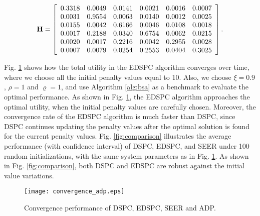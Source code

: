\documentclass[10pt,journal,letterpaper,compsoc]{IEEEtran}
\begin{document}
{{\vspace{-0.25cm}
\begin{small}
\[
\mathbf{H }= \left[ {\begin{array}{*{20}c}
   {{\rm{0}}{\rm{.3318}}} & {{\rm{0}}{\rm{.0049}}} & {{\rm{0}}{\rm{.0141}}} & {{\rm{0}}{\rm{.0021}}} & {{\rm{0}}{\rm{.0016}}} & {{\rm{0}}{\rm{.0007}}}  \\
   {{\rm{0}}{\rm{.0031}}} & {{\rm{0}}{\rm{.9554}}} & {{\rm{0}}{\rm{.0063}}} & {{\rm{0}}{\rm{.0140}}} & {{\rm{0}}{\rm{.0012}}} & {{\rm{0}}{\rm{.0025}}}  \\
   {{\rm{0}}{\rm{.0155}}} & {{\rm{0}}{\rm{.0042}}} & {{\rm{0}}{\rm{.6166}}} & {{\rm{0}}{\rm{.0046}}} & {{\rm{0}}{\rm{.0108}}} & {{\rm{0}}{\rm{.0018}}}  \\
   {{\rm{0}}{\rm{.0017}}} & {{\rm{0}}{\rm{.2188}}} & {{\rm{0}}{\rm{.0340}}} & {{\rm{0}}{\rm{.6754}}} & {{\rm{0}}{\rm{.0062}}} & {{\rm{0}}{\rm{.0215}}}  \\
   {{\rm{0}}{\rm{.0020}}} & {{\rm{0}}{\rm{.0017}}} & {{\rm{0}}{\rm{.2216}}} & {{\rm{0}}{\rm{.0042}}} & {{\rm{0}}{\rm{.2955}}} & {{\rm{0}}{\rm{.0028}}}  \\
   {{\rm{0}}{\rm{.0007}}} & {{\rm{0}}{\rm{.0079}}} & {{\rm{0}}{\rm{.0254}}} & {{\rm{0}}{\rm{.2553}}} & {{\rm{0}}{\rm{.0404}}} & {{\rm{0}}{\rm{.3025}}}  \\
\end{array}} \right].
\]
\end{small}



Fig. \ref{fig:convergence} shows how the total utility in the EDSPC algorithm converges over time, where we choose all the initial penalty values equal to 10. Also, we choose $\xi=0.9$, $\rho=1$ and $\varrho=1$, and use Algorithm \ref{alg:bsa} as a benchmark to evaluate the optimal performance. As shown in Fig. \ref{fig:convergence}, the EDSPC algorithm  approaches the optimal utility, when the initial penalty values are carefully chosen. Moreover, the convergence rate of the EDSPC algorithm is much faster than DSPC, since DSPC continues updating the penalty values after the optimal solution is found for the current penalty values. Fig. \ref{fig:comparison} illustrates the average performance (with confidence interval) of DSPC, EDSPC, and SEER under 100 random initializations, with the same system parameters as in Fig. \ref{fig:convergence}. As shown in Fig. \ref{fig:comparison}, both DSPC and EDSPC are robust against the initial value variations.

\begin{figure}[t]
\begin{center}
\vspace{-0.0cm}\hspace{-0.0cm} {\texttt{[image: convergence\_adp.eps]}}\hspace{-0.0cm}
\vspace{0cm} \caption{Convergence performance of DSPC, EDSPC, SEER and ADP.}\vspace{-0.0cm}
\label{fig:convergence}
\end{center}
\end{figure}

}}
\end{document}

